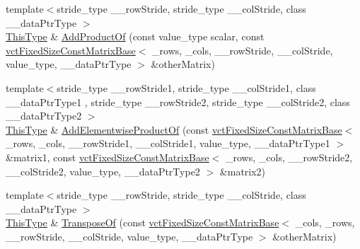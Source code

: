 \begin{DoxyCompactItemize}
\item 
{\footnotesize template$<$stride\-\_\-type \-\_\-\-\_\-row\-Stride, stride\-\_\-type \-\_\-\-\_\-col\-Stride, class \-\_\-\-\_\-data\-Ptr\-Type $>$ }\\\hyperlink{classvct_fixed_size_const_matrix_base_a7ec66a96ed7e08ce9ff54093133c9d8d}{This\-Type} \& \hyperlink{classvct_fixed_size_matrix_base_abb7e005c519dc3ab9b8cfe800027b649}{Add\-Product\-Of} (const value\-\_\-type scalar, const \hyperlink{classvct_fixed_size_const_matrix_base}{vct\-Fixed\-Size\-Const\-Matrix\-Base}$<$ \-\_\-rows, \-\_\-cols, \-\_\-\-\_\-row\-Stride, \-\_\-\-\_\-col\-Stride, value\-\_\-type, \-\_\-\-\_\-data\-Ptr\-Type $>$ \&other\-Matrix)
\item 
{\footnotesize template$<$stride\-\_\-type \-\_\-\-\_\-row\-Stride1, stride\-\_\-type \-\_\-\-\_\-col\-Stride1, class \-\_\-\-\_\-data\-Ptr\-Type1 , stride\-\_\-type \-\_\-\-\_\-row\-Stride2, stride\-\_\-type \-\_\-\-\_\-col\-Stride2, class \-\_\-\-\_\-data\-Ptr\-Type2 $>$ }\\\hyperlink{classvct_fixed_size_const_matrix_base_a7ec66a96ed7e08ce9ff54093133c9d8d}{This\-Type} \& \hyperlink{classvct_fixed_size_matrix_base_adf78b1be92121cada1de6cde352a36ac}{Add\-Elementwise\-Product\-Of} (const \hyperlink{classvct_fixed_size_const_matrix_base}{vct\-Fixed\-Size\-Const\-Matrix\-Base}$<$ \-\_\-rows, \-\_\-cols, \-\_\-\-\_\-row\-Stride1, \-\_\-\-\_\-col\-Stride1, value\-\_\-type, \-\_\-\-\_\-data\-Ptr\-Type1 $>$ \&matrix1, const \hyperlink{classvct_fixed_size_const_matrix_base}{vct\-Fixed\-Size\-Const\-Matrix\-Base}$<$ \-\_\-rows, \-\_\-cols, \-\_\-\-\_\-row\-Stride2, \-\_\-\-\_\-col\-Stride2, value\-\_\-type, \-\_\-\-\_\-data\-Ptr\-Type2 $>$ \&matrix2)
\item 
{\footnotesize template$<$stride\-\_\-type \-\_\-\-\_\-row\-Stride, stride\-\_\-type \-\_\-\-\_\-col\-Stride, class \-\_\-\-\_\-data\-Ptr\-Type $>$ }\\\hyperlink{classvct_fixed_size_const_matrix_base_a7ec66a96ed7e08ce9ff54093133c9d8d}{This\-Type} \& \hyperlink{classvct_fixed_size_matrix_base_a65e4f750f2e62ce8732ce58f29d25427}{Transpose\-Of} (const \hyperlink{classvct_fixed_size_const_matrix_base}{vct\-Fixed\-Size\-Const\-Matrix\-Base}$<$ \-\_\-cols, \-\_\-rows, \-\_\-\-\_\-row\-Stride, \-\_\-\-\_\-col\-Stride, value\-\_\-type, \-\_\-\-\_\-data\-Ptr\-Type $>$ \&other\-Matrix)
\item 

\end{DoxyCompactItemize}
